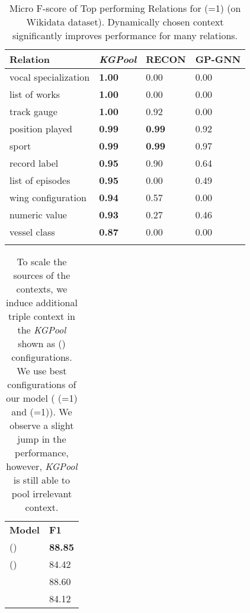 \documentclass[11pt,a4paper]{article}
\newlength\Origarrayrulewidth
\newcommand{\Cline}[1]{\noalign{\global\setlength\Origarrayrulewidth{\arrayrulewidth}}\noalign{\global\setlength\arrayrulewidth{1.1pt}}\cline{#1}\noalign{\global\setlength\arrayrulewidth{\Origarrayrulewidth}}}
\begin{document}
\begin{table}[!htbp]
\small
    \centering
    \begin{tabular}{p{2.5 cm}|p{1.2cm}|p{1.2cm}|p{1.3cm}}
        \Cline{1-4}
        \textbf{Relation} & \textbf{\textit{KGPool}}  &  \textbf{RECON}&  \textbf{GP-GNN}  \\
        \hline
vocal specialization & \textbf{1.00} & 0.00& 0.00\\
          list of works &\textbf{1.00} & 0.00& 0.00\\
          track gauge & \textbf{1.00} & 0.92 & 0.00\\
         position played & \textbf{0.99} & \textbf{0.99}& 0.92 \\
          sport & \textbf{0.99} & \textbf{0.99} & 0.97\\
          record label &\textbf{0.95} & 0.90& 0.64\\
          list of episodes & \textbf{0.95} & 0.00& 0.49\\
        wing configuration & \textbf{0.94} & 0.57& 0.00 \\
       numeric value & \textbf{0.93} & 0.27 & 0.46\\
        vessel class & \textbf{0.87} & 0.00& 0.00 \\
        
\hline
\Cline{1-4}
    \end{tabular}
\caption{Micro F-score of Top performing Relations for  (=1) (on Wikidata dataset). Dynamically chosen context significantly improves performance for many relations.}
    \label{best}
    \vspace{-3mm}
\end{table}


\begin{table}[!htb]
    \centering
   \begin{tabular}{p{3.5cm}|p{0.8cm}}
\hline
\textbf{Model}  & \textbf{F1} \\
        \Cline{1-2}
 () & \textbf{88.85} \\
    () & 84.42 \\
   \hline
 & 88.60 \\
             & 84.12 \\
       \hline
    \end{tabular}
    \caption{To scale the sources of the contexts, we induce additional triple context in the \textit{KGPool} shown as () configurations. We use best configurations of our model ( (=1) and   (=1)). We observe a slight jump in the performance, however, \textit{KGPool} is still able to pool irrelevant context.}
    \label{tab:triple}
        \vspace{-2mm}
\end{table} 
\end{document}
